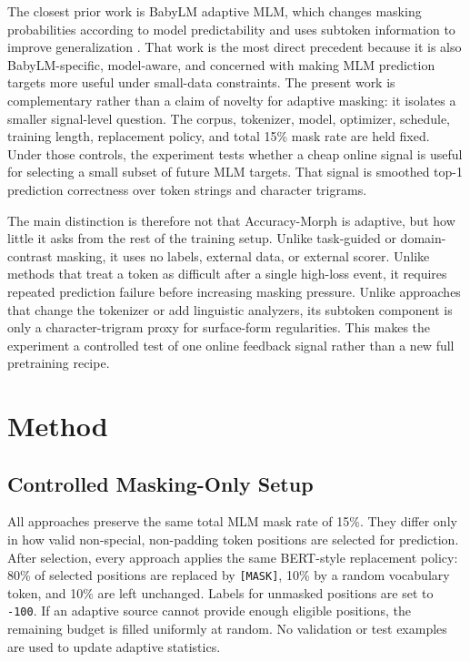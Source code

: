 \documentclass[11pt]{article}
\begin{document}
The closest prior work is BabyLM adaptive MLM, which changes masking probabilities according to model predictability and uses subtoken information to improve generalization \citep{edman2025mask}.
That work is the most direct precedent because it is also BabyLM-specific, model-aware, and concerned with making MLM prediction targets more useful under small-data constraints.
The present work is complementary rather than a claim of novelty for adaptive masking: it isolates a smaller signal-level question.
The corpus, tokenizer, model, optimizer, schedule, training length, replacement policy, and total 15\% mask rate are held fixed.
Under those controls, the experiment tests whether a cheap online signal is useful for selecting a small subset of future MLM targets.
That signal is smoothed top-1 prediction correctness over token strings and character trigrams.

The main distinction is therefore not that Accuracy-Morph is adaptive, but how little it asks from the rest of the training setup.
Unlike task-guided or domain-contrast masking, it uses no labels, external data, or external scorer.
Unlike methods that treat a token as difficult after a single high-loss event, it requires repeated prediction failure before increasing masking pressure.
Unlike approaches that change the tokenizer or add linguistic analyzers, its subtoken component is only a character-trigram proxy for surface-form regularities.
This makes the experiment a controlled test of one online feedback signal rather than a new full pretraining recipe.

\section{Method}

\subsection{Controlled Masking-Only Setup}

All approaches preserve the same total MLM mask rate of 15\%.
They differ only in how valid non-special, non-padding token positions are selected for prediction.
After selection, every approach applies the same BERT-style replacement policy: 80\% of selected positions are replaced by \texttt{[MASK]}, 10\% by a random vocabulary token, and 10\% are left unchanged.
Labels for unmasked positions are set to \texttt{-100}.
If an adaptive source cannot provide enough eligible positions, the remaining budget is filled uniformly at random.
No validation or test examples are used to update adaptive statistics.
\end{document}
